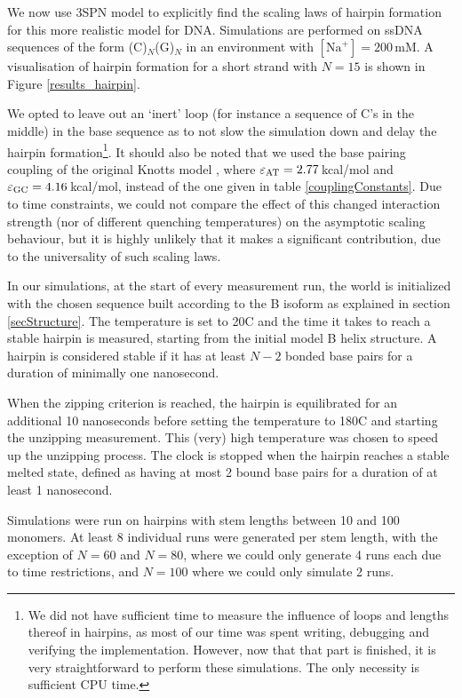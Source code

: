 We now use 3SPN model to explicitly find the scaling laws of hairpin formation for this more realistic model for DNA.
Simulations are performed on ssDNA sequences of the form (C)$_N$(G)$_N$ in an environment with $[\text{Na}^+] = 200$\,mM. A visualisation of hairpin formation for a short strand with $N = 15$ is shown in Figure \ref{results_hairpin}.

We opted to leave out an `inert' loop (for instance a sequence of C's in the middle) in the base sequence as to not slow the simulation down and delay the hairpin formation\footnote{We did not have sufficient time to measure the influence of loops and lengths thereof in hairpins, as most of our time was spent writing, debugging and verifying the implementation.
However, now that that part is finished, it is very straightforward to perform these simulations. The only necessity is sufficient CPU time.}.
It should also be noted that we used the base pairing coupling of the original Knotts model \cite{knotts2007coarse}, where $\varepsilon_\text{AT} = 2.77$\,kcal/mol and $\varepsilon_\text{GC} = 4.16$\,kcal/mol, instead of the one given in table \ref{couplingConstants}.
Due to time constraints, we could not compare the effect of this changed interaction strength (nor of different quenching temperatures) on the asymptotic scaling behaviour, but it is highly unlikely that it makes a significant contribution, due to the universality of such scaling laws.



In our simulations, at the start of every measurement run, the world is initialized with the chosen sequence built according to the B isoform as explained in section \ref{secStructure}.
The temperature is set to 20{\degree}C and the time it takes to reach a stable hairpin is measured, starting from the initial model B helix structure.
A hairpin is considered stable if it has at least $N-2$ bonded base pairs for a duration of minimally one nanosecond.

When the zipping criterion is reached, the hairpin is equilibrated for an additional 10 nanoseconds before setting the temperature to 180{\degree}C and starting the unzipping measurement.
This (very) high temperature was chosen to speed up the unzipping process.
The clock is stopped when the hairpin reaches a stable melted state, defined as having at most 2 bound base pairs for a duration of at least 1 nanosecond.

Simulations were run on hairpins with stem lengths between 10 and 100 monomers. At least 8 individual runs were generated per stem length, with the exception of $N = 60$ and $N = 80$, where we could only generate 4 runs each due to time restrictions, and $N = 100$ where we could only simulate 2 runs.

